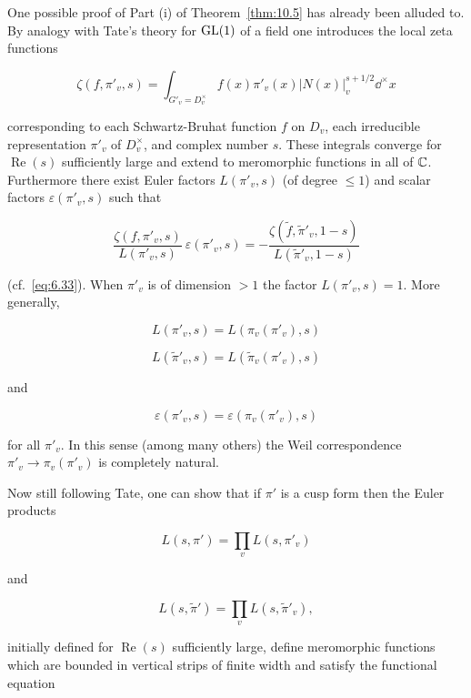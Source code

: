 One possible proof of Part (i) of Theorem~\ref{thm:10.5} has already been alluded to. By analogy with Tate's theory for $\operatorname{GL}(1)$ of a field one introduces the local zeta functions

\begin{equation}\label{eq:10.4}
\zeta(f, \pi'_v, s) = \int_{G'_v = D_v^{\times}} f(x)\pi'_v(x)|N(x)|_v^{s + 1/2} \dd^{\times}x\tag{10.4}
\end{equation}

corresponding to each Schwartz-Bruhat function $f$ on $D_v$, each irreducible representation $\pi'_v$ of $D_v^{\times}$, and complex number $s$. These integrals converge for $\operatorname{Re}(s)$ sufficiently large and extend to meromorphic functions in all of $\mathbb{C}$. Furthermore there exist Euler factors $L(\pi'_v, s)$ (of degree $\leq 1$) and scalar factors $\varepsilon(\pi'_v, s)$ such that

\begin{equation}\label{eq:10.5}
\frac{\zeta(f, \pi'_v, s)}{L(\pi'_v, s)}\ \varepsilon(\pi'_v, s) = -\frac{\zeta(\tilde{f}, \tilde{\pi}'_v, 1 - s)}{L(\tilde{\pi}'_v, 1 - s)}\tag{10.5}
\end{equation}

(cf.\ \eqref{eq:6.33}). When $\pi'_v$ is of dimension $> 1$ the factor $L(\pi'_v, s) = 1$. More generally,

\begin{equation}\label{eq:10.6}
L(\pi'_v, s) = L(\pi_v(\pi'_v), s)\tag{10.6}
\end{equation}

\[
L(\tilde{\pi}'_v, s) = L(\tilde{\pi}_v(\pi'_v), s)
\]

and

\begin{equation}\label{eq:10.7}
\varepsilon(\pi'_v, s) = \varepsilon(\pi_v(\pi'_v), s)\tag{10.7}
\end{equation}

for all $\pi'_v$. In this sense (among many others) the Weil correspondence $\pi'_v \to \pi_v(\pi'_v)$ is completely natural.

Now still following Tate, one can show that if $\pi'$ is a cusp form then the Euler products

\[
L(s, \pi') = \prod_v L(s, \pi'_v)
\]

and

\[
L(s, \tilde{\pi}') = \prod_v L(s, \tilde{\pi}'_v),
\]

initially defined for $\operatorname{Re}(s)$ sufficiently large, define meromorphic functions which are bounded in vertical strips of finite width and satisfy the functional equation

